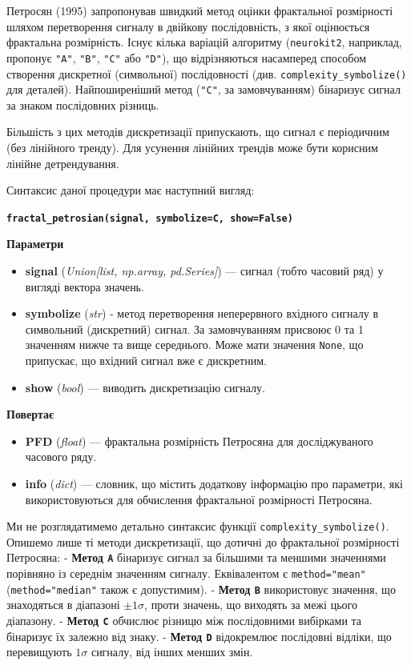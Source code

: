 \documentclass[
  letterpaper,
]{report}
\providecommand{\tightlist}{%
  \setlength{\itemsep}{0pt}\setlength{\parskip}{0pt}}\usepackage{longtable,booktabs,array}
\begin{document}
Петросян (1995) запропонував швидкий метод оцінки фрактальної
розмірності шляхом перетворення сигналу в двійкову послідовність, з якої
оцінюється фрактальна розмірність. Існує кілька варіацій алгоритму
(\texttt{neurokit2}, наприклад, пропонує \texttt{"A"}, \texttt{"B"},
\texttt{"C"} або \texttt{"D"}), що відрізняються насамперед способом
створення дискретної (символьної) послідовності (див.
\texttt{complexity\_symbolize()} для деталей). Найпоширеніший метод
(\texttt{"C"}, за замовчуванням) бінаризує сигнал за знаком послідовних
різниць.

Більшість з цих методів дискретизації припускають, що сигнал є
періодичним (без лінійного тренду). Для усунення лінійних трендів може
бути корисним лінійне детрендування.

Синтаксис даної процедури має наступний вигляд:

\textbf{\texttt{fractal\_petrosian(signal,\ symbolize=\textquotesingle{}C\textquotesingle{},\ show=False)}}

\textbf{Параметри}

\begin{itemize}
\tightlist
\item
  \textbf{signal} (\emph{Union{[}list, np.array, pd.Series{]}}) ---
  сигнал (тобто часовий ряд) у вигляді вектора значень.
\item
  \textbf{symbolize} (\emph{str}) - метод перетворення неперервного
  вхідного сигналу в символьний (дискретний) сигнал. За замовчуванням
  присвоює 0 та 1 значенням нижче та вище середнього. Може мати значення
  \texttt{None}, що припускає, що вхідний сигнал вже є дискретним.
\item
  \textbf{show} (\emph{bool}) --- виводить дискретизацію сигналу.
\end{itemize}

\textbf{Повертає}

\begin{itemize}
\tightlist
\item
  \textbf{PFD} (\emph{float}) --- фрактальна розмірність Петросяна для
  досліджуваного часового ряду.
\item
  \textbf{info} (\emph{dict}) --- словник, що містить додаткову
  інформацію про параметри, які використовуються для обчислення
  фрактальної розмірності Петросяна.
\end{itemize}

Ми не розглядатимемо детально синтаксис функції
\texttt{complexity\_symbolize()}. Опишемо лише ті методи дискретизації,
що дотичні до фрактальної розмірності Петросяна: - \textbf{Метод
\texttt{A}} бінаризує сигнал за більшими та меншими значеннями порівняно
із середнім значенням сигналу. Еквівалентом є \texttt{method="mean"}
(\texttt{method="median"} також є допустимим). - \textbf{Метод
\texttt{B}} використовує значення, що знаходяться в діапазоні
\(\pm 1\sigma\), проти значень, що виходять за межі цього діапазону. -
\textbf{Метод \texttt{C}} обчислює різницю між послідовними вибірками та
бінаризує їх залежно від знаку. - \textbf{Метод \texttt{D}} відокремлює
послідовні відліки, що перевищують \(1\sigma\) сигналу, від інших менших
змін.
\end{document}
